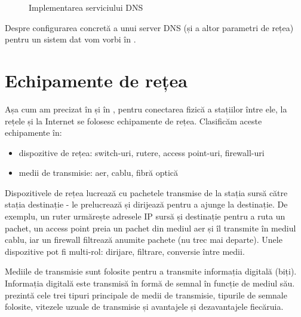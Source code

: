 \begin{figure}[htbp]
  \centering
  \def\svgwidth{\columnwidth}
  
  \caption{Implementarea serviciului DNS}
  \label{fig:net:dns-service}
\end{figure}

Despre configurarea concretă a unui server DNS (și a altor parametri de rețea) pentru un sistem dat vom vorbi în .

\section{Echipamente de rețea}
\label{sec:net:equipment}

Așa cum am precizat în  și în , pentru conectarea fizică a stațiilor între ele, la rețele și la Internet se folosesc echipamente de rețea. Clasificăm aceste echipamente în:

\begin{itemize}
  \item dispozitive de rețea: switch-uri, rutere, access point-uri, firewall-uri
  \item medii de transmisie: aer, cablu, fibră optică
\end{itemize}

Dispozitivele de rețea lucrează cu pachetele transmise de la stația sursă către stația destinație - le prelucrează și dirijează pentru a ajunge la destinație. De exemplu, un ruter urmărește adresele IP sursă și destinație pentru a ruta un pachet, un access point preia un pachet din mediul aer și îl transmite în mediul cablu, iar un firewall filtrează anumite pachete (nu trec mai departe). Unele dispozitive pot fi multi-rol: dirijare, filtrare, conversie între medii.

Mediile de transmisie sunt folosite pentru a transmite informația digitală (biți). Informația digitală este transmisă în formă de semnal în funcție de mediul său.  prezintă cele trei tipuri principale de medii de transmisie, tipurile de semnale folosite, vitezele uzuale de transmisie și avantajele și dezavantajele fiecăruia.


